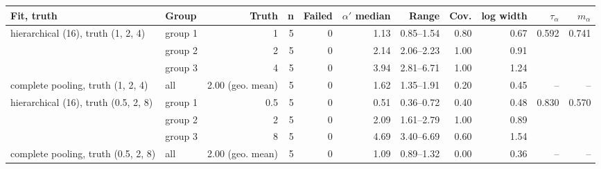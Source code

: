 \noindent\begin{minipage}{\linewidth}
\label{tab:S13}
\centering\scriptsize
\begin{tabular}{llrrrrrrrrr}
\toprule
Fit, truth & Group & Truth & n & Failed & $\alpha'$ median & Range & Cov. & log width & $\tau_\alpha$ & $m_\alpha$ \\ \midrule
hierarchical (16), truth (1, 2, 4) & group 1 & 1 & 5 & 0 & 1.13 & 0.85–1.54 & 0.80 & 0.67 & 0.592 & 0.741 \\
 & group 2 & 2 & 5 & 0 & 2.14 & 2.06–2.23 & 1.00 & 0.91 &  &  \\
 & group 3 & 4 & 5 & 0 & 3.94 & 2.81–6.71 & 1.00 & 1.24 &  &  \\
complete pooling, truth (1, 2, 4) & all & 2.00 (geo. mean) & 5 & 0 & 1.62 & 1.35–1.91 & 0.20 & 0.45 & – & – \\
hierarchical (16), truth (0.5, 2, 8) & group 1 & 0.5 & 5 & 0 & 0.51 & 0.36–0.72 & 0.40 & 0.48 & 0.830 & 0.570 \\
 & group 2 & 2 & 5 & 0 & 2.09 & 1.61–2.79 & 1.00 & 0.89 &  &  \\
 & group 3 & 8 & 5 & 0 & 4.69 & 3.40–6.69 & 0.60 & 1.54 &  &  \\
complete pooling, truth (0.5, 2, 8) & all & 2.00 (geo. mean) & 5 & 0 & 1.09 & 0.89–1.32 & 0.00 & 0.36 & – & – \\
\bottomrule
\end{tabular}
\end{minipage}
\vspace{22pt}

